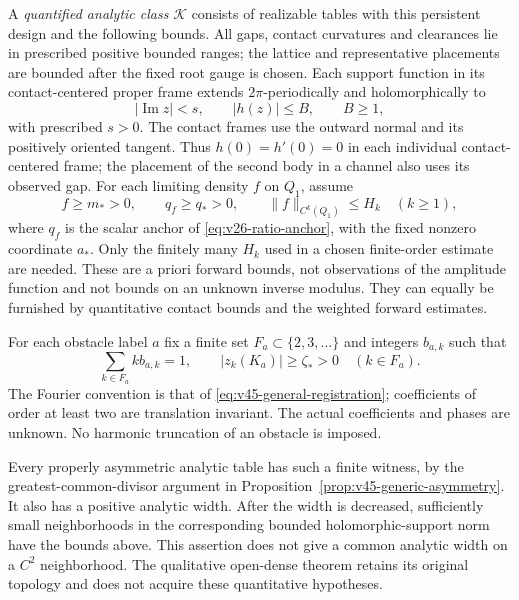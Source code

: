 A \emph{quantified analytic class} $\mathcal K$ consists of realizable tables
with this persistent design and the following bounds.  All gaps, contact
curvatures and clearances lie in prescribed positive bounded ranges; the
lattice and representative placements are bounded after the fixed root gauge
is chosen.  Each support function in its contact-centered proper frame extends
$2\pi$-periodically and holomorphically to
\begin{equation}\label{eq:v46-strip-bound}
 |\operatorname{Im}z|<s,\qquad |h(z)|\le B,
 \qquad B\ge1,
\end{equation}
with prescribed $s>0$.  The contact frames use the outward normal and its
positively oriented tangent.  Thus $h(0)=h'(0)=0$ in each individual
contact-centered frame; the placement of the second body in a channel also
uses its observed gap.  For each limiting density $f$ on $Q_1$, assume
\begin{equation}\label{eq:v46-forward-bounds}
 f\ge m_*>0,\qquad q_f\ge q_*>0,\qquad
 \|f\|_{C^k(Q_1)}\le H_k\quad(k\ge1),
\end{equation}
where $q_f$ is the scalar anchor of \eqref{eq:v26-ratio-anchor},
with the fixed nonzero coordinate $a_*$.
Only the finitely many $H_k$ used in a chosen finite-order estimate are needed.
These are a priori forward bounds, not observations of the amplitude function
and not bounds on an unknown inverse modulus.  They can equally be furnished
by quantitative contact bounds and the weighted forward estimates.

For each obstacle label $a$ fix a finite set $F_a\subset\{2,3,\ldots\}$ and
integers $b_{a,k}$ such that
\begin{equation}\label{eq:v46-witness}
 \sum_{k\in F_a} k b_{a,k}=1,\qquad
 |z_k(K_a)|\ge\zeta_*>0\quad(k\in F_a).
\end{equation}
The Fourier convention is that of \eqref{eq:v45-general-registration};
coefficients of order at least two are translation invariant.  The actual coefficients and phases are unknown.  No harmonic truncation of an obstacle
is imposed.

Every properly asymmetric analytic table has such a finite witness, by the
greatest-common-divisor argument in
Proposition~\ref{prop:v45-generic-asymmetry}.  It also has a positive analytic
width.  After the width is decreased, sufficiently small neighborhoods in
the corresponding bounded holomorphic-support norm have the bounds above.
This assertion does not give a common analytic width on a $C^2$ neighborhood.
The qualitative open-dense theorem retains its original topology and does
not acquire these quantitative hypotheses.

